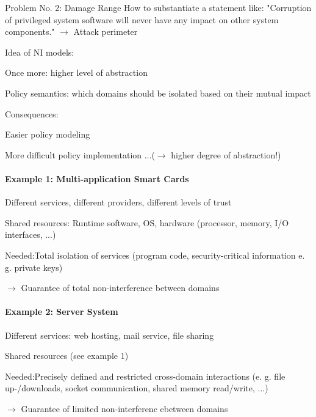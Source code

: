 \documentclass[a4paper]{article}
\begin{document}
\begin{multicols}{3}
    Problem No. 2: Damage Range
    How to substantiate a statement like: "Corruption of privileged system software will never have any impact on other system components." $\rightarrow$ Attack perimeter

    Idea of NI models:
    \begin{itemize*}
        \item Once more: higher level of abstraction
        \item Policy semantics: which domains should be isolated based on their mutual impact
    \end{itemize*}

    Consequences:
    \begin{itemize*}
        \item Easier policy modeling
        \item More difficult policy implementation ...($\rightarrow$ higher degree of abstraction!)
    \end{itemize*}


    \paragraph{Example 1: Multi-application Smart Cards}
    \begin{itemize*}
        \item Different services, different providers, different levels of trust
        \item Shared resources: Runtime software, OS, hardware (processor, memory, I/O interfaces, ...)
        \item Needed:Total isolation of services (program code, security-critical information e. g. private keys)
        \item $\rightarrow$ Guarantee of total non-interference between domains
    \end{itemize*}

    \paragraph{Example 2: Server System}
    \begin{itemize*}
        \item Different services: web hosting, mail service, file sharing
        \item Shared resources (see example 1)
        \item Needed:Precisely defined and restricted cross-domain interactions (e. g. file up-/downloads, socket communication, shared memory read/write, ...)
        \item $\rightarrow$ Guarantee of limited non-interferenc ebetween domains
    \end{itemize*}


\end{multicols}
\end{document}
